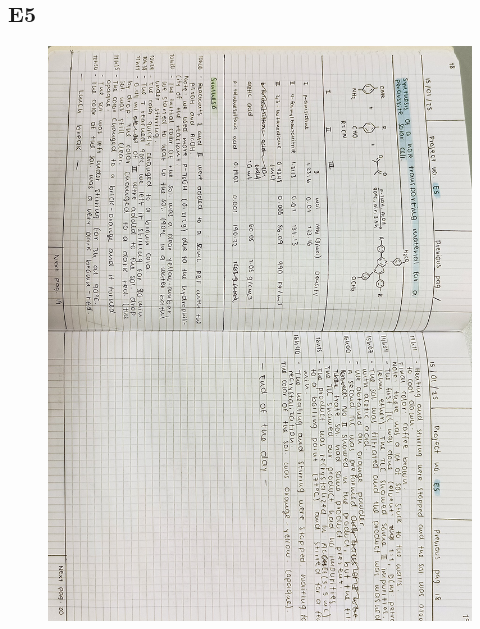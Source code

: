 \subsection{E5}
\begin{figure}[H]
	\centering
	\includegraphics[width=0.6\linewidth, angle=90]{../images/compressed/IMG20250123173010.jpg}
\end{figure}


